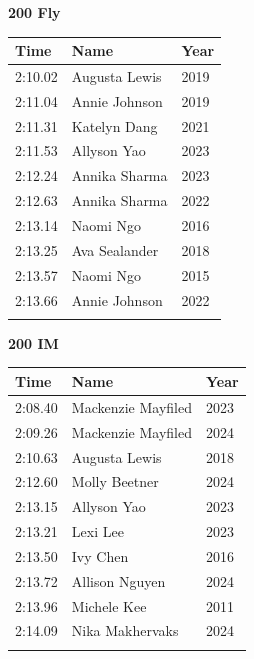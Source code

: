 \vspace{1.2em}
\noindent\begin{minipage}[t]{0.48\textwidth}
\centering
\textbf{\textcolor{teamprimary}{200 Fly}}\par
\vspace{0.5em}
\centering
\small
\renewcommand{\arraystretch}{1.0}
\setlength{\tabcolsep}{4pt}
\begin{tabular}{@{}p{1.8cm}p{3.0cm}p{1.0cm}@{}}
\toprule
\textbf{Time} & \textbf{Name} & \textbf{Year} \\
\midrule
2:10.02 & Augusta Lewis & 2019 \\
2:11.04 & Annie Johnson & 2019 \\
2:11.31 & Katelyn Dang & 2021 \\
2:11.53 & Allyson Yao & 2023 \\
2:12.24 & Annika Sharma & 2023 \\
2:12.63 & Annika Sharma & 2022 \\
2:13.14 & Naomi Ngo & 2016 \\
2:13.25 & Ava Sealander & 2018 \\
2:13.57 & Naomi Ngo & 2015 \\
2:13.66 & Annie Johnson & 2022 \\
\bottomrule
\vspace{0.5em}
\end{tabular}
\end{minipage}
\hfill
\begin{minipage}[t]{0.48\textwidth}
\centering
\textbf{\textcolor{teamprimary}{200 IM}}\par
\vspace{0.5em}
\centering
\small
\renewcommand{\arraystretch}{1.0}
\setlength{\tabcolsep}{4pt}
\begin{tabular}{@{}p{1.8cm}p{3.0cm}p{1.0cm}@{}}
\toprule
\textbf{Time} & \textbf{Name} & \textbf{Year} \\
\midrule
2:08.40 & Mackenzie Mayfiled & 2023 \\
2:09.26 & Mackenzie Mayfiled & 2024 \\
2:10.63 & Augusta Lewis & 2018 \\
2:12.60 & Molly Beetner & 2024 \\
2:13.15 & Allyson Yao & 2023 \\
2:13.21 & Lexi Lee & 2023 \\
2:13.50 & Ivy Chen & 2016 \\
2:13.72 & Allison Nguyen & 2024 \\
2:13.96 & Michele Kee & 2011 \\
2:14.09 & Nika Makhervaks & 2024 \\
\bottomrule
\vspace{0.5em}
\end{tabular}
\end{minipage}
